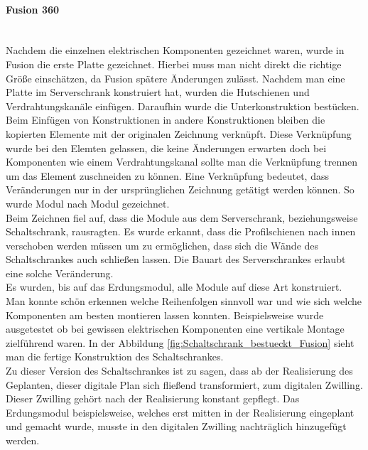     \paragraph{Fusion 360}\mbox{}\\
    Nachdem die einzelnen elektrischen Komponenten gezeichnet waren, wurde in Fusion die erste Platte gezeichnet. Hierbei muss man nicht direkt die richtige Größe einschätzen, da Fusion spätere Änderungen zulässt. Nachdem man eine Platte im Serverschrank konstruiert hat, wurden die Hutschienen und Verdrahtungskanäle einfügen. Daraufhin wurde die Unterkonstruktion bestücken. Beim Einfügen von Konstruktionen in andere Konstruktionen bleiben die kopierten Elemente mit der originalen Zeichnung verknüpft. Diese Verknüpfung wurde bei den Elemten gelassen, die keine Änderungen erwarten doch bei Komponenten wie einem Verdrahtungskanal sollte man die Verknüpfung trennen um das Element zuschneiden zu können. Eine Verknüpfung bedeutet, dass Veränderungen nur in der ursprünglichen Zeichnung getätigt werden können. So wurde Modul nach Modul gezeichnet.\\
    Beim Zeichnen fiel auf, dass die Module aus dem Serverschrank, beziehungsweise Schaltschrank, rausragten. Es wurde erkannt, dass die Profilschienen nach innen verschoben werden müssen um zu ermöglichen, dass sich die Wände des Schaltschrankes auch schließen lassen. Die Bauart des Serverschrankes erlaubt eine solche Veränderung.\\ 
    Es wurden, bis auf das Erdungsmodul, alle Module auf diese Art konstruiert. Man konnte schön erkennen welche Reihenfolgen sinnvoll war und wie sich welche Komponenten am besten montieren lassen konnten. Beispielsweise wurde ausgetestet ob bei gewissen elektrischen Komponenten eine vertikale Montage zielführend waren. In der Abbildung \ref{fig:Schaltschrank_bestueckt_Fusion} sieht man die fertige Konstruktion des Schaltschrankes.\\
    Zu dieser Version des Schaltschrankes ist zu sagen, dass ab der Realisierung des Geplanten, dieser digitale Plan sich fließend transformiert, zum digitalen Zwilling. Dieser Zwilling gehört nach der Realisierung konstant gepflegt. Das Erdungsmodul beispielsweise, welches erst mitten in der Realisierung eingeplant und gemacht wurde, musste in den digitalen Zwilling nachträglich hinzugefügt werden.
